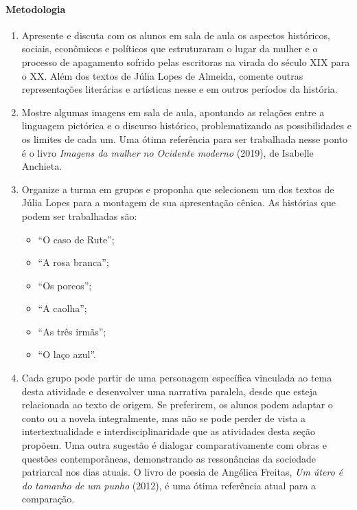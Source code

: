 \documentclass[12pt]{extarticle}
\begin{document}
\paragraph{Metodologia}

\begin{enumerate}
\item
Apresente e discuta com os alunos em sala de
aula os aspectos históricos, sociais, econômicos e políticos que
estruturaram o lugar da mulher e o processo de apagamento sofrido pelas
escritoras na virada do século XIX para o XX. Além dos textos de Júlia
Lopes de Almeida, comente outras representações literárias e artísticas
nesse e em outros períodos da história.

\item
Mostre algumas imagens em sala de aula, apontando as relações entre a
linguagem pictórica e o discurso histórico, problematizando as
possibilidades e os limites de cada um. Uma ótima referência para ser
trabalhada nesse ponto é o livro \emph{Imagens da mulher no Ocidente
moderno} (2019), de Isabelle Anchieta.

\item
Organize a turma em grupos e proponha que selecionem um dos textos de
Júlia Lopes para a montagem de sua apresentação cênica. As histórias que
podem ser trabalhadas são:

\begin{itemize}
\item
  ``O caso de Rute'';
\item
  ``A rosa branca'';
\item
  ``Os porcos'';
\item
  ``A caolha'';
\item
  ``As três irmãs'';
\item
  ``O laço azul''.
\end{itemize}

\item
Cada grupo pode partir de uma personagem específica vinculada ao tema
desta atividade e desenvolver uma narrativa paralela, desde que esteja
relacionada ao texto de origem. Se preferirem, os alunos podem adaptar o
conto ou a novela integralmente, mas não se pode perder de vista a
intertextualidade e interdisciplinaridade que as atividades desta seção
propõem. Uma outra sugestão é dialogar comparativamente com obras e
questões contemporâneas, demonstrando as ressonâncias da sociedade
patriarcal nos dias atuais. O livro de poesia de Angélica Freitas,
\emph{Um útero é do tamanho de um punho} (2012), é uma ótima referência
atual para a comparação.


\end{enumerate}
\end{document}
